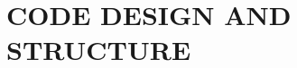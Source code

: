 \documentclass[../Dissertation]{subfiles}
\begin{document}
    \chapter[\uppercase{Code Design and Structure}]{\uppercase{Code Design and Structure}}
    \label{chp:4}
      \lipsum[1] %
    
    
    
    
    
    


    \printbibliography[segment=\therefsegment,heading=references]
    
\end{document}
